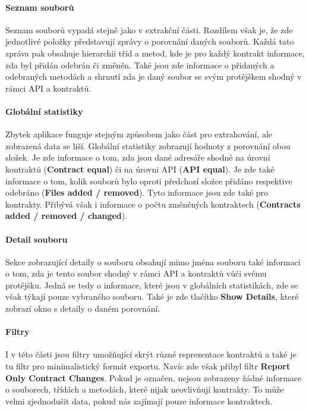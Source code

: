 		\paragraph{Seznam souborů}
			Seznam souborů vypadá stejně jako v extrakční části. Rozdílem však je, že zde jednotlivé položky představují zprávy o porovnání daných souborů. Každá tato zpráva pak obsahuje hierarchii tříd a metod, kde je pro každý kontrakt informace, zda byl přidán odebrán či změněn. Také jsou zde informace o přidaných a odebraných metodách a shrnutí zda je daný soubor se svým protějškem shodný v rámci API a kontraktů.
		
		\paragraph{Globální statistiky}
			Zbytek aplikace funguje stejným způsobem jako část pro extrahování, ale zobrazená data se liší. Globální statistiky zobrazují hodnoty z porovnání obou složek. Je zde informace o tom, zda jsou dané adresáře shodné na úrovni kontraktů (\textbf{Contract equal}) či na úrovni API (\textbf{API equal}). Je zde také informace o tom, kolik souborů bylo oproti předchozí složce přidáno respektive odebráno (\textbf{Files added / removed}). Tyto informace jsou zde také pro kontrakty. Přibývá však i informace o počtu změněných kontraktech (\textbf{Contracts added / removed / changed}).\\
		
		\paragraph{Detail souboru}
			Sekce zobrazující detaily o souboru obsahují mimo jména souboru také informaci o tom, zda je tento soubor shodný v rámci API a kontraktů vůči svému protějšku. Jedná se tedy o informace, které jsou v globálních statistikách, zde se však týkají pouze vybraného souboru. Také je zde tlačítko \textbf{Show Details}, které zobrazí okno s detaily o daném porovnání.\\
				
		\paragraph{Filtry}
			I v této části jsou filtry umožňující skrýt různé reprezentace kontraktů a také je tu filtr pro minimalistický formát exportu. Navíc zde však přibyl filtr \textbf{Report Only Contract Changes}. Pokud je označen, nejsou zobrazeny žádné informace o souborech, třídách a metodách, které nijak neovlivňují kontrakty. To může velmi zjednodušit data, pokud nás zajímají pouze informace  kontraktech.\\
			
